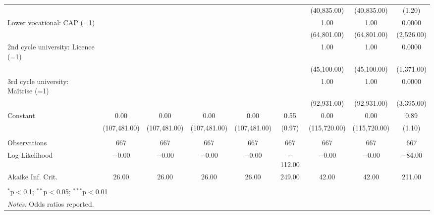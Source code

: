 \documentclass[
  a4paper, twoside, 12pt]{book}
\begin{document}
\begin{singlespacing}
\begin{table}[H]
\begin{tabular}{@{\extracolsep{-6pt}}lcccccccc}
  &  &  &  &  &  & (40,835.00) & (40,835.00) & (1.20) \\ 
  Lower vocational: CAP (=1) &  &  &  &  &  & 1.00 & 1.00 & 0.0000 \\ 
  &  &  &  &  &  & (64,801.00) & (64,801.00) & (2,526.00) \\ 
  2nd cycle university: Licence (=1) &  &  &  &  &  & 1.00 & 1.00 & 0.0000 \\ 
  &  &  &  &  &  & (45,100.00) & (45,100.00) & (1,371.00) \\ 
  3rd cycle university: Maîtrise (=1) &  &  &  &  &  & 1.00 & 1.00 & 0.0000 \\ 
  &  &  &  &  &  & (92,931.00) & (92,931.00) & (3,395.00) \\ 
  Constant & 0.00 & 0.00 & 0.00 & 0.00 & 0.55 & 0.00 & 0.00 & 0.89 \\ 
  & (107,481.00) & (107,481.00) & (107,481.00) & (107,481.00) & (0.97) & (115,720.00) & (115,720.00) & (1.10) \\ 
 \hline \\[-1.8ex] 
Observations & 667 & 667 & 667 & 667 & 667 & 667 & 667 & 667 \\ 
Log Likelihood & $-$0.00 & $-$0.00 & $-$0.00 & $-$0.00 & $-$112.00 & $-$0.00 & $-$0.00 & $-$84.00 \\ 
Akaike Inf. Crit. & 26.00 & 26.00 & 26.00 & 26.00 & 249.00 & 42.00 & 42.00 & 211.00 \\ 
\hline 
\hline \\[-1.8ex] 
\multicolumn{9}{l}{$^{*}$p$<$0.1; $^{**}$p$<$0.05; $^{***}$p$<$0.01} \\ 
\multicolumn{9}{l}{\textit{Notes:} Odds ratios reported.} \\ 
\end{tabular} 
\end{table} 
\begin{table}[H]


\end{table}
\end{singlespacing}
\end{document}

